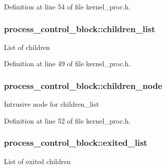Definition at line 54 of file kernel\+\_\+proc.\+h.

\subsubsection[{\texorpdfstring{children\+\_\+list}{children_list}}]{ process\+\_\+control\+\_\+block\+::children\+\_\+list}\hypertarget{structprocess__control__block_a79b0dd70bbfff1d7da6ab4cbbd00eb1f}{}\label{structprocess__control__block_a79b0dd70bbfff1d7da6ab4cbbd00eb1f}
List of children 

Definition at line 49 of file kernel\+\_\+proc.\+h.

\subsubsection[{\texorpdfstring{children\+\_\+node}{children_node}}]{ process\+\_\+control\+\_\+block\+::children\+\_\+node}\hypertarget{structprocess__control__block_a5b9aeabcc3d676cda39eb563a4cc5bd9}{}\label{structprocess__control__block_a5b9aeabcc3d676cda39eb563a4cc5bd9}
Intrusive node for {\ttfamily children\+\_\+list} 

Definition at line 52 of file kernel\+\_\+proc.\+h.

\subsubsection[{\texorpdfstring{exited\+\_\+list}{exited_list}}]{ process\+\_\+control\+\_\+block\+::exited\+\_\+list}\hypertarget{structprocess__control__block_afddb936103b136214462e1ed870c4c70}{}\label{structprocess__control__block_afddb936103b136214462e1ed870c4c70}
List of exited children 

